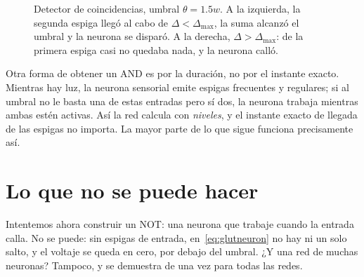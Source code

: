 \begin{figure}[t]
\centering
{}
\caption{Detector de coincidencias, umbral $\theta=1.5w$. A la izquierda, la segunda espiga llegó al cabo de $\Delta<\Delta_{\max}$, la suma alcanzó el umbral y la neurona se disparó. A la derecha, $\Delta>\Delta_{\max}$: de la primera espiga casi no quedaba nada, y la neurona calló.}
\label{fig:coincidence}
\end{figure}

Otra forma de obtener un AND es por la duración, no por el instante exacto. Mientras hay luz, la neurona sensorial emite espigas frecuentes y regulares; si al umbral no le basta una de estas entradas pero sí dos, la neurona trabaja mientras ambas estén activas. Así la red calcula con \emph{niveles}, y el instante exacto de llegada de las espigas no importa. La mayor parte de lo que sigue funciona precisamente así.

\section{Lo que no se puede hacer}

Intentemos ahora construir un NOT: una neurona que trabaje cuando la entrada calla. No se puede: sin espigas de entrada, en~\eqref{eq:glutneuron} no hay ni un solo salto, y el voltaje se queda en cero, por debajo del umbral. ¿Y una red de muchas neuronas? Tampoco, y se demuestra de una vez para todas las redes.

